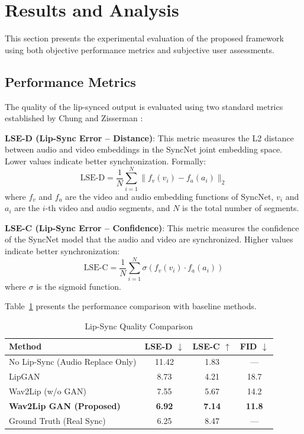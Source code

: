 \documentclass[conference]{IEEEtran}
\begin{document}
\section{Results and Analysis}

This section presents the experimental evaluation of the proposed framework using both objective performance metrics and subjective user assessments.

\subsection{Performance Metrics}

The quality of the lip-synced output is evaluated using two standard metrics established by Chung and Zisserman \cite{b7}:

\textbf{LSE-D (Lip-Sync Error -- Distance)}: This metric measures the L2 distance between audio and video embeddings in the SyncNet joint embedding space. Lower values indicate better synchronization. Formally:
\begin{equation}
\text{LSE-D} = \frac{1}{N} \sum_{i=1}^{N} \| f_v(v_i) - f_a(a_i) \|_2
\label{eq:lsed}
\end{equation}
where $f_v$ and $f_a$ are the video and audio embedding functions of SyncNet, $v_i$ and $a_i$ are the $i$-th video and audio segments, and $N$ is the total number of segments.

\textbf{LSE-C (Lip-Sync Error -- Confidence)}: This metric measures the confidence of the SyncNet model that the audio and video are synchronized. Higher values indicate better synchronization:
\begin{equation}
\text{LSE-C} = \frac{1}{N} \sum_{i=1}^{N} \sigma(f_v(v_i) \cdot f_a(a_i))
\label{eq:lsec}
\end{equation}
where $\sigma$ is the sigmoid function.

Table~\ref{tab:results} presents the performance comparison with baseline methods.

\begin{table}[htbp]
\caption{Lip-Sync Quality Comparison}
\begin{center}
\begin{tabular}{lccc}
\toprule
\textbf{Method} & \textbf{LSE-D $\downarrow$} & \textbf{LSE-C $\uparrow$} & \textbf{FID $\downarrow$} \\
\midrule
No Lip-Sync (Audio Replace Only) & 11.42 & 1.83 & --- \\
LipGAN \cite{b8} & 8.73 & 4.21 & 18.7 \\
Wav2Lip (w/o GAN) \cite{b5} & 7.55 & 5.67 & 14.2 \\
\textbf{Wav2Lip GAN (Proposed)} & \textbf{6.92} & \textbf{7.14} & \textbf{11.8} \\
Ground Truth (Real Sync) & 6.25 & 8.47 & --- \\
\bottomrule
\end{tabular}
\label{tab:results}
\end{center}
\end{table}
\end{document}
